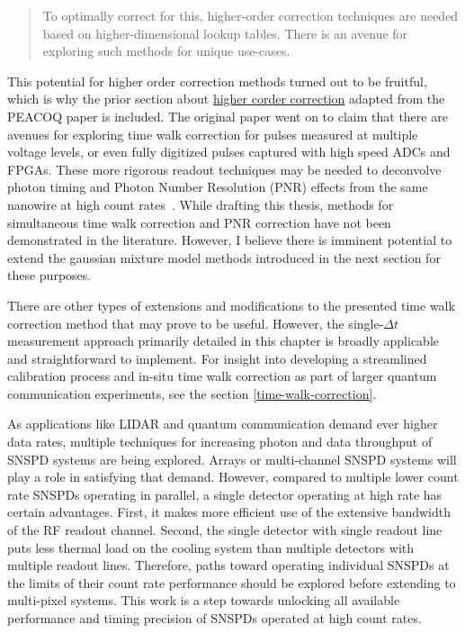 \documentclass[11pt]{caltech_thesis} %
\begin{document}
\begin{quote}
To optimally correct for this, higher-order correction techniques are needed based on higher-dimensional lookup tables. There is an avenue for exploring such methods for unique use-cases. \autocite{Mueller2023}
\end{quote}

This potential for higher order correction methods turned out to be fruitful, which is why the prior section about \href{section_05_peacoq_2nd_order.md\#second-order-calibration}{higher corder correction} adapted from the PEACOQ paper \autocite{Craiciu23} is included. The original paper went on to claim that there are avenues for exploring time walk correction for pulses measured at multiple voltage levels, or even fully digitized pulses captured with high speed ADCs and FPGAs. These more rigorous readout techniques may be needed to deconvolve photon timing and Photon Number Resolution (PNR) effects from the same nanowire at high count rates~\autocite{Hao2021}. While drafting this thesis, methods for simultaneous time walk correction and PNR correction have not been demonstrated in the literature. However, I believe there is imminent potential to extend the gaussian mixture model methods introduced in the next section for these purposes.

There are other types of extensions and modifications to the presented time walk correction method that may prove to be useful. However, the single-$\Delta t$ measurement approach primarily detailed in this chapter is broadly applicable and straightforward to implement. For insight into developing a streamlined calibration process and in-situ time walk correction as part of larger quantum communication experiments, see the section \ref{time-walk-correction}.

As applications like LIDAR and quantum communication demand ever higher data rates, multiple techniques for increasing photon and data throughput of SNSPD systems are being explored. Arrays or multi-channel SNSPD systems will play a role in satisfying that demand. However, compared to multiple lower count rate SNSPDs operating in parallel, a single detector operating at high rate has certain advantages. First, it makes more efficient use of the extensive bandwidth of the RF readout channel. Second, the single detector with single readout line puts less thermal load on the cooling system than multiple detectors with multiple readout lines. Therefore, paths toward operating individual SNSPDs at the limits of their count rate performance should be explored before extending to multi-pixel systems. This work is a step towards unlocking all available performance and timing precision of SNSPDs operated at high count rates.
\end{document}
